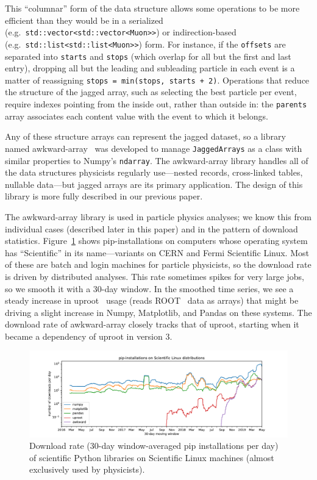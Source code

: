\documentclass[a4paper]{jpconf}
\begin{document}
This ``columnar'' form of the data structure allows some operations to be more efficient than they would be in a serialized (e.g.\ {\tt std::vector<std::vector<Muon>>}) or indirection-based (e.g.\ {\tt std::list<std::list<Muon>>}) form. For instance, if the {\tt offsets} are separated into {\tt starts} and {\tt stops} (which overlap for all but the first and last entry), dropping all but the leading and subleading particle in each event is a matter of reassigning {\tt stops = min(stops, starts + 2)}. Operations that reduce the structure of the jagged array, such as selecting the best particle per event, require indexes pointing from the inside out, rather than outside in: the {\tt parents} array associates each content value with the event to which it belongs.

Any of these structure arrays can represent the jagged dataset, so a library named awkward-array~\cite{awkward} was developed to manage {\tt JaggedArrays} as a class with similar properties to Numpy's {\tt ndarray}. The awkward-array library handles all of the data structures physicists regularly use---nested records, cross-linked tables, nullable data---but jagged arrays are its primary application. The design of this library is more fully described in our previous paper\cite{2019EPJWC}.

The awkward-array library is used in particle physics analyses; we know this from individual cases (described later in this paper) and in the pattern of download statistics. Figure~\ref{fig:uproot} shows pip-installations on computers whose operating system has ``Scientific'' in its name---variants on CERN and Fermi Scientific Linux. Most of these are batch and login machines for particle physicists, so the download rate is driven by distributed analyses. This rate sometimes spikes for very large jobs, so we smooth it with a 30-day window. In the smoothed time series, we see a steady increase in uproot~\cite{uproot} usage (reads ROOT~\cite{root} data as arrays) that might be driving a slight increase in Numpy, Matplotlib, and Pandas on these systems. The download rate of awkward-array closely tracks that of uproot, starting when it became a dependency of uproot in version 3.

\begin{figure}
\includegraphics[width=\linewidth]{pip-scientificlinux-uproot.pdf}

\caption{Download rate (30-day window-averaged pip installations per day) of scientific Python libraries on Scientific Linux machines (almost exclusively used by physicists). \label{fig:uproot}}
\end{figure}
\end{document}
